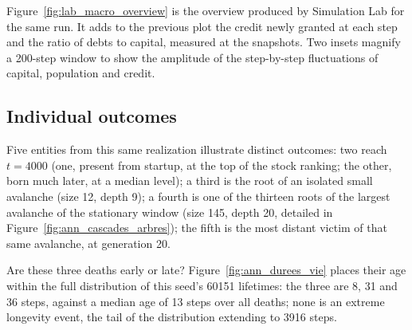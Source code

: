 Figure~\ref{fig:lab_macro_overview} is the overview produced by
Simulation Lab for the same run. It adds to the previous plot the credit
newly granted at each step and the ratio of debts to capital, measured at
the snapshots. Two insets magnify a 200-step window to show the amplitude
of the step-by-step fluctuations of capital, population and credit.


\subsection{Individual outcomes}
Five entities from this same realization illustrate distinct outcomes:
two reach $t=4000$ (one, present from startup, at the top of the stock
ranking; the other, born much later, at a median level); a third is the
root of an isolated small avalanche (size 12, depth 9); a fourth is one
of the thirteen roots of the largest avalanche of the stationary window
(size 145, depth 20, detailed in Figure~\ref{fig:ann_cascades_arbres});
the fifth is the most distant victim of that same avalanche, at
generation 20.


Are these three deaths early or late? Figure~\ref{fig:ann_durees_vie}
places their age within the full distribution of this seed's 60151
lifetimes: the three are 8, 31 and 36 steps, against a median age of 13
steps over all deaths; none is an extreme longevity event, the tail of
the distribution extending to 3916 steps.

